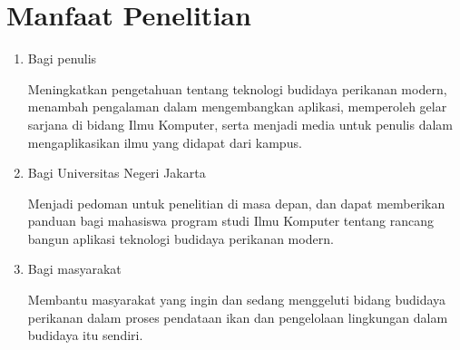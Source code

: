 \section{Manfaat Penelitian}
\begin{enumerate}
	\item Bagi penulis
		
	Meningkatkan pengetahuan tentang teknologi budidaya perikanan modern, menambah pengalaman dalam mengembangkan aplikasi, memperoleh gelar sarjana di bidang Ilmu Komputer, serta menjadi media untuk penulis dalam mengaplikasikan ilmu yang didapat dari kampus.
		
	\item Bagi Universitas Negeri Jakarta
	 	
	Menjadi pedoman untuk penelitian di masa depan, dan dapat memberikan panduan bagi mahasiswa program studi Ilmu Komputer tentang rancang bangun aplikasi teknologi budidaya perikanan modern.
	
	\item Bagi masyarakat
	 	
	Membantu masyarakat yang ingin dan sedang menggeluti bidang budidaya perikanan dalam proses pendataan ikan dan pengelolaan lingkungan dalam budidaya itu sendiri.
	 			
\end{enumerate}


\begin{comment}

\end{comment}
